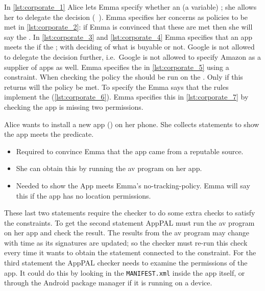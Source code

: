 \documentclass[]{llncs}
\begin{document}
In \autoref{lst:corporate_1} Alice lets Emma specify whether an  (a variable) ;
she allows her to delegate the decision (\/~).
Emma specifies her concerns as policies to be met in \autoref{lst:corporate_2}:
  if Emma is convinced that these are met then she will say the .
In \autoref{lst:corporate_3} and \autoref{lst:corporate_4} Emma specifies that an app meets the  if the ;
  with  deciding of what is buyable or not.
Google is not allowed to delegate the decision further, i.e.~Google is not allowed to specify Amazon as a supplier of apps as well.
Emma specifies the  in \autoref{lst:corporate_5} using a constraint.
When checking the policy the  should be run on the .
Only if this returns  will the policy be met.
To specify the  Emma says that the  rules implement the  (\autoref{lst:corporate_6}).
Emma specifies this in \autoref{lst:corporate_7} by checking the app is missing two permissions.

Alice wants to install a new app () on her phone.
She collects statements to show the app meets the  predicate.
\begin{itemize}
  \item{}
    Required to convince Emma that the app came from a reputable source.
  \item{}
    She can obtain this by running the \ac{av} program on her app.
  \item{}
    Needed to show the App meets Emma's no-tracking-policy.
    Emma will say this if the app has no location permissions.
\end{itemize}
These last two statements require the checker to do some extra checks to satisfy the constraints.
To get the second statement AppPAL must run the \ac{av} program on her app and check the result.
The results from the \ac{av} program may change with time as its signatures are updated;
  so the checker must re-run this check every time it wants to obtain the statement connected to the constraint.
For the third statement the AppPAL checker needs to examine the permissions of the app.
It could do this by looking in the \texttt{MANIFEST.xml} inside the app itself, or through the Android package manager if it is running on a device.
\end{document}
